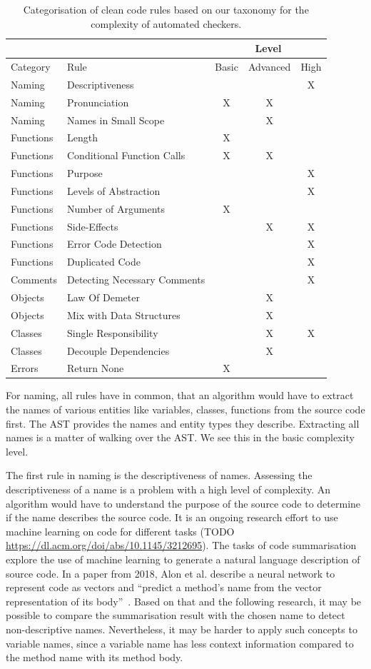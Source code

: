 \begin{table}[h]
\begin{tabularx}{\textwidth}{XXccc}
\toprule
&     & \multicolumn{3}{c}{Level} \\ \midrule
Category&Rule & Basic  & Advanced  & High \\ \midrule
Naming&Descriptiveness&&& X\\
Naming&Pronunciation&X&X& \\
Naming&Names in Small Scope&&X& \\
Functions&Length&X&&\\
Functions&Conditional Function Calls&X&X& \\
Functions&Purpose&&&X\\
Functions&Levels of Abstraction&&&X\\
Functions&Number of Arguments&X&& \\
Functions&Side-Effects&&X&X\\
Functions&Error Code Detection&&&X \\
Functions&Duplicated Code&&&X \\
Comments&Detecting Necessary Comments&&&X \\
Objects&Law Of Demeter&&X& \\
Objects&Mix with Data Structures&&X& \\
Classes&Single Responsibility&&X&X \\
Classes&Decouple Dependencies&&X& \\
Errors&Return None&X&& \\
\bottomrule
\end{tabularx}
\caption{Categorisation of clean code rules based on our taxonomy for the complexity of automated checkers.}
\label{tab:complexity_level_overview}
\end{table}


For naming, all rules have in common, that an algorithm would have to extract the names of various entities like variables, classes, functions from the source code first. The AST provides the names and entity types they describe. Extracting all names is a matter of walking over the AST. We see this in the basic complexity level.

The first rule in naming is the descriptiveness of names. Assessing the descriptiveness of a name is a problem with a high level of complexity. An algorithm would have to understand the purpose of the source code to determine if the name describes the source code. It is an ongoing research effort to use machine learning on code for different tasks (TODO \url{https://dl.acm.org/doi/abs/10.1145/3212695}). The tasks of code summarisation explore the use of machine learning to generate a natural language description of source code. In a paper from 2018, Alon et al. describe a neural network to represent code as vectors and \enquote{predict a method’s name from the vector representation of its body}~\cite{alon_code2vec_2018}. Based on that and the following research, it may be possible to compare the summarisation result with the chosen name to detect non-descriptive names. Nevertheless, it may be harder to apply such concepts to variable names, since a variable name has less context information compared to the method name with its method body.


